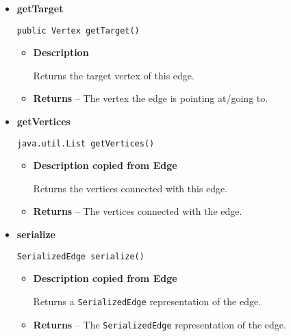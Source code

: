 {{{{{{{{{{{{{{{{{\begin{itemize}
{\begin{itemize}
{Returns the source vertex of this directed edge.
}
\item{{\bf  Returns} -- 
The vertex the edge is coming from. 
}%
\end{itemize}
}%
\item{ 
{\bf  getTarget}\\
\begin{lstlisting}[frame=none]
public Vertex getTarget()\end{lstlisting} %
\begin{itemize}
\item{
{\bf  Description}

Returns the target vertex of this edge.
}
\item{{\bf  Returns} -- 
The vertex the edge is pointing at/going to. 
}%
\end{itemize}
}%
\item{ 
{\bf  getVertices}\\
\begin{lstlisting}[frame=none]
java.util.List getVertices()\end{lstlisting} %
\begin{itemize}
\item{
{\bf  Description copied from Edge{\small {}} }

Returns the vertices connected with this edge.
}
\item{{\bf  Returns} -- 
The vertices connected with the edge. 
}%
\end{itemize}
}%
\item{ 
{\bf  serialize}\\
\begin{lstlisting}[frame=none]
SerializedEdge serialize()\end{lstlisting} %
\begin{itemize}
\item{
{\bf  Description copied from Edge{\small {}} }

Returns a \texttt{\small SerializedEdge}{\small 
{}} representation of the edge.
}
\item{{\bf  Returns} -- 
The \texttt{\small SerializedEdge}{\small 
{}} representation of the edge. 
}%
\end{itemize}
}%
\end{itemize}
}
}
}}}}}}}}}}}}}}}
